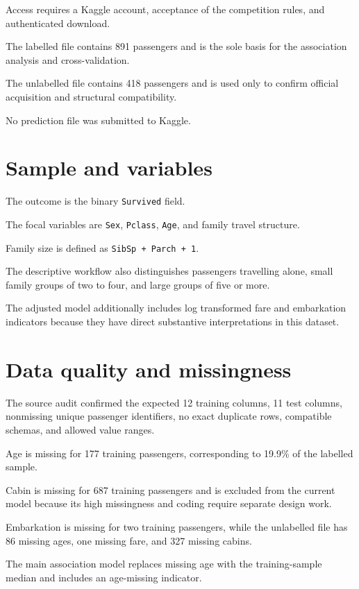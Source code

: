 \documentclass[preprint,12pt,authoryear]{elsarticle}
\begin{document}
Access requires a Kaggle account, acceptance of the competition rules, and authenticated download.

The labelled file contains 891 passengers and is the sole basis for the association analysis and cross-validation.

The unlabelled file contains 418 passengers and is used only to confirm official acquisition and structural compatibility.

No prediction file was submitted to Kaggle.

\section{Sample and variables}

The outcome is the binary \texttt{Survived} field.

The focal variables are \texttt{Sex}, \texttt{Pclass}, \texttt{Age}, and family travel structure.

Family size is defined as \texttt{SibSp + Parch + 1}.

The descriptive workflow also distinguishes passengers travelling alone, small family groups of two to four, and large groups of five or more.

The adjusted model additionally includes log transformed fare and embarkation indicators because they have direct substantive interpretations in this dataset.

\section{Data quality and missingness}

The source audit confirmed the expected 12 training columns, 11 test columns, nonmissing unique passenger identifiers, no exact duplicate rows, compatible schemas, and allowed value ranges.

Age is missing for 177 training passengers, corresponding to 19.9\% of the labelled sample.

Cabin is missing for 687 training passengers and is excluded from the current model because its high missingness and coding require separate design work.

Embarkation is missing for two training passengers, while the unlabelled file has 86 missing ages, one missing fare, and 327 missing cabins.

The main association model replaces missing age with the training-sample median and includes an age-missing indicator.
\end{document}
